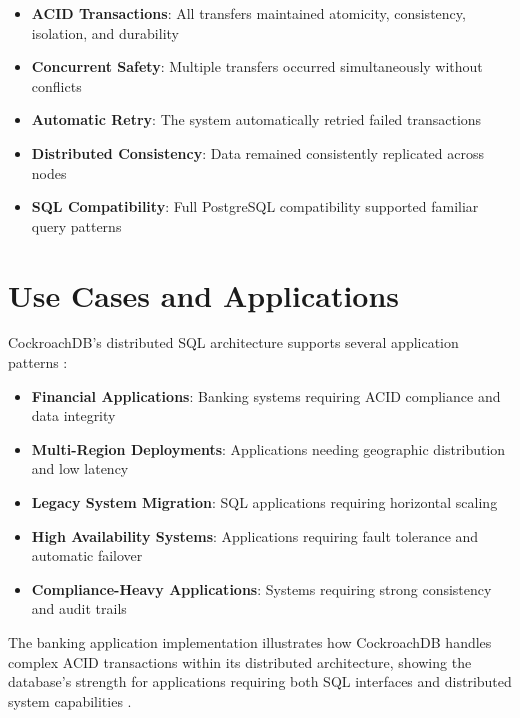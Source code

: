 \begin{itemize}
    \item \textbf{ACID Transactions}: All transfers maintained atomicity, consistency, isolation, and durability \parencite{acid_properties}
    \item \textbf{Concurrent Safety}: Multiple transfers occurred simultaneously without conflicts \parencite{cockroachdb_docs}
    \item \textbf{Automatic Retry}: The system automatically retried failed transactions \parencite{cockroachdb_paper}
    \item \textbf{Distributed Consistency}: Data remained consistently replicated across nodes \parencite{cockroachdb_docs}
    \item \textbf{SQL Compatibility}: Full PostgreSQL compatibility supported familiar query patterns \parencite{cockroachdb_paper}
\end{itemize}

\section{Use Cases and Applications}

CockroachDB's distributed SQL architecture supports several application patterns \parencite{cockroachdb_paper}:

\begin{itemize}
    \item \textbf{Financial Applications}: Banking systems requiring ACID compliance and data integrity \parencite{acid_properties}
    \item \textbf{Multi-Region Deployments}: Applications needing geographic distribution and low latency \parencite{cockroachdb_docs}
    \item \textbf{Legacy System Migration}: SQL applications requiring horizontal scaling \parencite{cockroachdb_paper}
    \item \textbf{High Availability Systems}: Applications requiring fault tolerance and automatic failover \parencite{cockroachdb_docs}
    \item \textbf{Compliance-Heavy Applications}: Systems requiring strong consistency and audit trails \parencite{acid_properties}
\end{itemize}

The banking application implementation illustrates how CockroachDB handles complex ACID transactions within its distributed architecture, showing the database's strength for applications requiring both SQL interfaces and distributed system capabilities \parencite{cockroachdb_paper}.